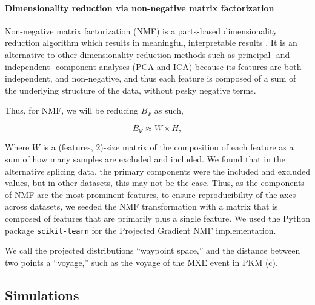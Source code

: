 \paragraph{Dimensionality reduction via non-negative matrix factorization}
Non\hyp{}negative matrix factorization (NMF) is a parts\hyp{}based dimensionality reduction algorithm which results in meaningful, interpretable results \cite{Lee:1999gw}. It is an alternative to other dimensionality reduction methods such as principal- and independent- component analyses (PCA and ICA) because its features are both independent, and non-negative, and thus each feature is composed of a sum of the underlying structure of the data, without pesky negative terms.

Thus, for NMF, we will be reducing $B_\Psi$ as such,

\begin{equation}
B_\Psi \approx W \times H,
\end{equation}

Where $W$ is a (features, $2$)-size matrix of the composition of each feature as a sum of how many samples are excluded and included. We found that in the alternative splicing data, the primary components were the included and excluded values, but in other datasets, this may not be the case. Thus, as the components of NMF are the most prominent features, to ensure reproducibility of the axes across datasets, we seeded the NMF transformation with a matrix that is composed of features that are primarily \0 plus a single \1 feature. We used the Python package \texttt{scikit-learn} \cite{Pedregosa:2011tv} for the Projected Gradient NMF implementation.

We call the projected distributions ``waypoint space,'' and the distance between two points a ``voyage,'' such as the voyage of the MXE event in PKM (c).


\subsection{Simulations}
\label{subsubsec:bonvoyage_simulations}



